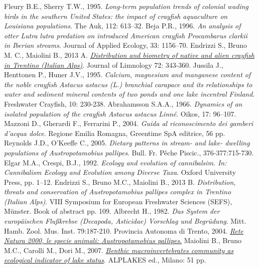 \documentclass[10pt,twoside,openany,x11names,svgnames,italian,a5paper,dvipsnames,table]{memoir}
\begin{document}
\begin{thebibliography}{9}
 Fleury B.E., Sherry T.W., 1995. \emph{Long-term population trends of colonial wading birds in the southern United States: the impact of crayfish aquaculture on Louisiana populations}. The Auk, 112: 613–32.
 Beja P.R., 1996. \emph{An analysis of otter Lutra lutra predation on introduced American crayfish Procambarus clarkii in Iberian streams}. Journal of Applied Ecology, 33: 1156–70.
 Endrizzi S., Bruno M. C., Maiolini B., 2013 A. \href{http://www.jlimnol.it/index.php/jlimnol/article/view/jlimnol.2013.e28}{\emph{Distribution and biometry of native and alien crayfish in Trentino (Italian Alps)}}. Journal of Limnology 72: 343-360.
 Jussila J., Henttonen P., Huner J.V., 1995. \emph{Calcium, magnesium and manganese content of the noble crayfish \emph{Astacus astacus} (L.) branchial carapace and its relationships to water and sediment mineral contents of two ponds and one lake incentral Finland}. Freshwater Crayfish, 10: 230-238.
 Abrahamsson S.A.A., 1966. \emph{Dynamics of an isolated population of the crayfish \emph{Astacus astacus} Linné}. Oikos, 17: 96–107.
 Mazzoni D., Gherardi F., Ferrarini P., 2004. \emph{Guida al riconoscimento dei gamberi d’acqua dolce}. Regione Emilia Romagna, Greentime SpA editrice, 56 pp.
 Reynolds J.D., O’Keeffe C., 2005. \emph{Dietary patterns in stream- and lake- dwelling populations of \emph{Austropotamobius pallipes}}. Bull. Fr. Pêche Piscic., 376-377:715-730.
 Elgar M.A., Crespi, B.J., 1992. \emph{Ecology and evolution of cannibalsim. In: Cannibalism Ecology and Evolution among Diverse Taxa}. Oxford University Press, pp. 1–12.
Endrizzi S., Bruno M.C., Maiolini B., 2013 B. \emph{Distribution, threats and conservation of \emph{Austropotamobius pallipes} complex in Trentino (Italian Alps)}. VIII Symposium for European Freshwater Sciences (SEFS), Münster. Book of abstract pp. 109.
 Albrecht H., 1982. \emph{Das System der europäischen Flußkrebse (\emph{Decapoda}, \emph{Asticidae}) Vorschlag und Begrüdung}. Mitt. Hamb. Zool. Mus. Inst. 79:187-210.
 Provincia Autonoma di Trento, 2004. \href{http://www.areeprotette.provincia.tn.it/natura2000/ animali/in_austropotamobius_pallipes.html}{\emph{Rete Natura 2000, le specie animali: \emph{Austropotamobius pallipes}}.}
 Maiolini B., Bruno M.C., Carolli M., Dori M., 2007. \href{http://www.alpine-space.org/uploads/media/Alplakes_Ecological_indicator_of_lake_status.pdf}{\emph{Benthic macroinvertebrates community as ecological indicator of lake status}}. ALPLAKES ed., Milano: 51 pp.

\end{thebibliography}
\end{document}
